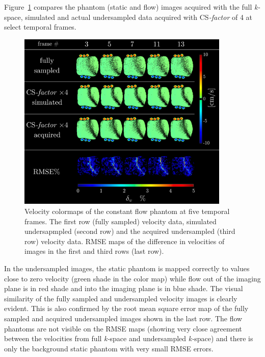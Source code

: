 Figure~\ref{fig: CS6} compares the phantom (static and flow) images acquired with the full \mbox{\textit{k-}space}, simulated and actual undersampled data acquired with \mbox{CS\textit{-factor}} of 4 at select temporal frames. 
\begin{figure}[!htb]
\vspace{+0.2cm}
\centering
\includegraphics[width=0.9\textwidth]{Figures/CS1_10.pdf}
\caption[Velocity colormaps of the constant flow phantom at five temporal frames]{Velocity colormaps of the constant flow phantom at five temporal frames. The first row (fully sampled) velocity data, simulated undersapmpled (second row) and the acquired undersampled (third row) velocity data. RMSE maps of the difference in velocities of images in the first and third rows (last row).}
\label{fig: CS6}
\end{figure}
In the undersampled images, the static phantom is mapped correctly to values close to zero velocity (green shade in the color map) while flow out of the imaging plane is in red shade and into the imaging plane is in blue shade. 
The visual similarity of the fully sampled and undersampled velocity images is clearly evident. 
This is also confirmed by the root mean square error map of the fully sampled and acquired undersampled images shown in the last row. 
The flow phantoms are not visible on the RMSE maps (showing very close agreement between the velocities from full \mbox{\textit{k-}space} and undersampled \mbox{\textit{k-}space}) and there is only the background static phantom with very small RMSE errors. 

